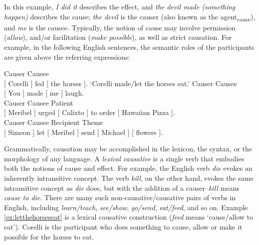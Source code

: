 In this example, \textit{I did it} describes the effect, and \textit{the devil made (something happen)} describes the cause; \textit{the devil} is the causer (also known as the agent\textsubscript{cause}), and \textit{me} is the causee.  Typically, the notion of cause may involve permission (\textit{allow}), and/or facilitation (\textit{make possible}), as well as strict causation. For example, in the following English sentences, the semantic roles of the participants are given above the referring expressions:

\ea
\label{bkm:Ref501028100}
    \ea
    \label{ex:letthehorseseat}
    \hspace{.15cm} Causer \hspace{.95cm} Causee \\
    {}[ Corelli ]  fed [ the horses ]. ‘Corelli made/let the horses eat.’
    \ex
    \label{ex:youmademelaugh}
    Causer \hspace{.7cm} Causee \\
    {}[ You ] made [ me ] laugh. \\
\newpage
    \ex
    \hspace{.15cm} Causer \hspace{1.45cm} Causee \hspace{1.8cm} Patient \\
    {}[ Meribel ]  urged [  Calixto ]  to order [ Hawaiian Pizza ]. \\
    \ex
    \label{ex:simeonletmeribelsendmichaelflowers}
    \hspace{.15cm} Causer \hspace{.9cm} Causee  \hspace{1.2cm} Recipient \hspace{.2cm} Theme \\
    {} [ Simeon ]  let [ Meribel ] send   [ 
 Michael ] [ flowers ]. \\
    \z
\z

Grammatically, causation may be accomplished in the lexicon, the syntax, or the morphology of any language. A \textit{lexical causative} is a single verb that embodies both the notions of cause and effect. For example, the English verb \textit{die} evokes an inherently intransitive concept. The verb \textit{kill}, on the other hand, evokes the same intransitive concept as \textit{die} does, but with the addition of a causer--\textit{kill} means \textit{cause to die}. There are many such non-causative/causative pairs of verbs in English, including \textit{learn/teach}, \textit{see/show}, \textit{go/send}, \textit{eat/feed}, and so on.  Example \ref{ex:letthehorseseat} is a lexical causative construction (\textit{feed} means ‘cause/allow to eat’). Corelli is the participant who does something to cause, allow or make it possible for the horses to eat.

